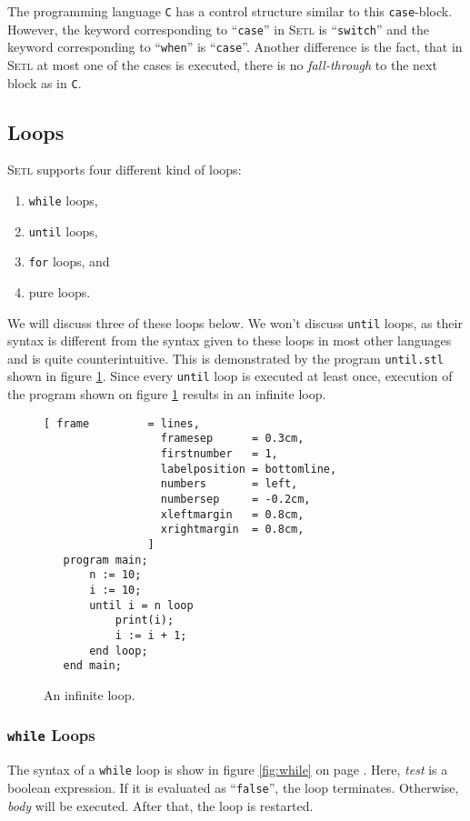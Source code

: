 The programming language \texttt{C} has a control structure similar to this
\texttt{case}-block.  However, the keyword corresponding to  ``\texttt{case}'' in \textsc{Setl}
is  ``\texttt{switch}'' and the keyword corresponding to  ``\texttt{when}'' is
 ``\texttt{case}''.  Another difference is the fact, that in \textsc{Setl} at most one of
 the cases is executed, there is no \emph{fall-through} to the next block as in
 \texttt{C}.

\subsection{Loops}
 \textsc{Setl} supports four different kind of loops:
 \begin{enumerate}
 \item \texttt{while} loops,
 \item \texttt{until} loops,
 \item \texttt{for} loops, and
 \item pure loops.
 \end{enumerate}
We will discuss three of these loops below.  We won't discuss  \texttt{until} loops, 
as their syntax is different from the syntax given to these loops in most other
languages and is quite counterintuitive.  This is demonstrated by the program
\texttt{until.stl} shown in figure \ref{fig:until.stl}.  Since every \texttt{until} loop
is executed at least once, execution of the program shown on figure \ref{fig:until.stl}
results in an infinite loop.

\begin{figure}[!ht]
\centering
\begin{Verbatim}[ frame         = lines, 
                  framesep      = 0.3cm, 
                  firstnumber   = 1,
                  labelposition = bottomline,
                  numbers       = left,
                  numbersep     = -0.2cm,
                  xleftmargin   = 0.8cm,
                  xrightmargin  = 0.8cm,
                ]
   program main;
       n := 10;
       i := 10;
       until i = n loop
           print(i);
           i := i + 1;
       end loop;
   end main;
\end{Verbatim}
\vspace*{-0.3cm}
\caption{An infinite loop.}
\label{fig:until.stl}
\end{figure}


\subsubsection{\texttt{while} Loops}
The syntax of a  \texttt{while} loop is show in figure \ref{fig:while} on page
\pageref{fig:while}.  Here,  \textsl{test} is a boolean expression.
If it is evaluated as  ``\texttt{false}'', the loop terminates.
Otherwise,  \textsl{body} will be executed.  After that, the loop is restarted.

